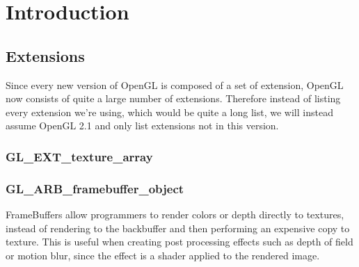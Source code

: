 \chapter{Introduction}


\section{Extensions}

Since every new version of OpenGL is composed of a set of extension,
OpenGL now consists of quite a large number of extensions. Therefore
instead of listing every extension we're using, which would be quite a
long list, we will instead assume OpenGL 2.1 and only list extensions
not in this version.

\subsection{GL\_EXT\_texture\_array}


\subsection{GL\_ARB\_framebuffer\_object}

FrameBuffers allow programmers to render colors or depth directly to
textures, instead of rendering to the backbuffer and then performing
an expensive copy to texture. This is useful when creating post
processing effects such as depth of field or motion blur, since the
effect is a shader applied to the rendered image.




